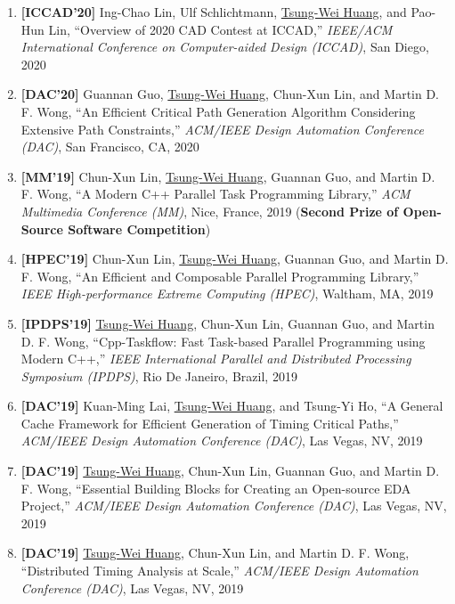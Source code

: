 \documentclass[A4,11pt]{article}
\begin{document}
\begin{enumerate}
    \item \textbf{[ICCAD'20]} Ing-Chao Lin, Ulf Schlichtmann, \underline{Tsung-Wei Huang}, and Pao-Hun Lin, ``Overview of 2020 CAD Contest at ICCAD,'' \textit{IEEE/ACM International Conference on Computer-aided Design (ICCAD)}, San Diego, 2020

    \item \textbf{[DAC'20]} Guannan Guo, \underline{Tsung-Wei Huang}, Chun-Xun Lin, and Martin D. F. Wong, ``An Efficient Critical Path Generation Algorithm Considering Extensive Path Constraints,'' \textit{ACM/IEEE Design Automation Conference (DAC)}, San Francisco, CA, 2020

    \item \textbf{[MM'19]} Chun-Xun Lin, \underline{Tsung-Wei Huang}, Guannan Guo, and Martin D. F. Wong, ``A Modern C++ Parallel Task Programming Library,'' \textit{ACM Multimedia Conference (MM)}, Nice, France, 2019 (\textbf{Second Prize of Open-Source Software Competition})

    \item \textbf{[HPEC'19]} Chun-Xun Lin, \underline{Tsung-Wei Huang}, Guannan Guo, and Martin D. F. Wong, ``An Efficient and Composable Parallel Programming Library,'' \textit{IEEE High-performance Extreme Computing (HPEC)}, Waltham, MA, 2019

    \item \textbf{[IPDPS'19]} \underline{Tsung-Wei Huang}, Chun-Xun Lin, Guannan Guo, and Martin D. F. Wong, ``Cpp-Taskflow: Fast Task-based Parallel Programming using Modern C++,'' \textit{IEEE International Parallel and Distributed Processing Symposium (IPDPS)}, Rio De Janeiro, Brazil, 2019

    \item \textbf{[DAC'19]} Kuan-Ming Lai, \underline{Tsung-Wei Huang}, and Tsung-Yi Ho, ``A General Cache Framework for Efficient Generation of Timing Critical Paths,'' \textit{ACM/IEEE Design Automation Conference (DAC)}, Las Vegas, NV, 2019

    \item \textbf{[DAC'19]} \underline{Tsung-Wei Huang}, Chun-Xun Lin, Guannan Guo, and Martin D. F. Wong, ``Essential Building Blocks for Creating an Open-source EDA Project,'' \textit{ACM/IEEE Design Automation Conference (DAC)}, Las Vegas, NV, 2019

    \item \textbf{[DAC'19]} \underline{Tsung-Wei Huang}, Chun-Xun Lin, and Martin D. F. Wong, ``Distributed Timing Analysis at Scale,'' \textit{ACM/IEEE Design Automation Conference (DAC)}, Las Vegas, NV, 2019


\end{enumerate}
\end{document}
